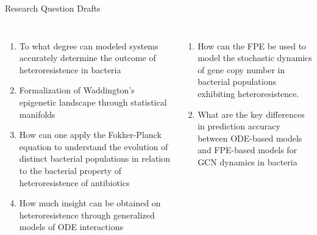 \documentclass[aspectratio=169, onlytextwidth,  notheorems, sOuRcEs, fleqn, leqno, ]{RUCPresentation}
\begin{document}
\begin{frame}{ Research Question Drafts }

    \vspace{2ex}
    \begin{columns}[T]

        \column{0.5\framewidth}

        \begin{enumerate}
            \item To what degree can modeled systems accurately determine the
                outcome of heteroresistence in bacteria
            \item Formalization of Waddington's epigenetic landscape through
                statistical manifolds
            \item How can one apply the Fokker-Planck equation to understand the
                evolution of distinct bacterial populations in relation to the
                bacterial property of heteroresistence of antibiotics
            \item How much insight can be obtained on heteroresistence through
                generalized models of ODE interactions
        \end{enumerate}

        \column{0.5\framewidth}

        \begin{enumerate}
            \item How can the FPE be used to model the stochastic dynamics of
                gene copy number in bacterial populations exhibiting heteroresistence.
            \item What are the key differences in prediction accuracy between
                ODE-based models and FPE-based models for GCN
                dynamics in bacteria
        \end{enumerate}

    \end{columns}



\end{frame}
\end{document}
